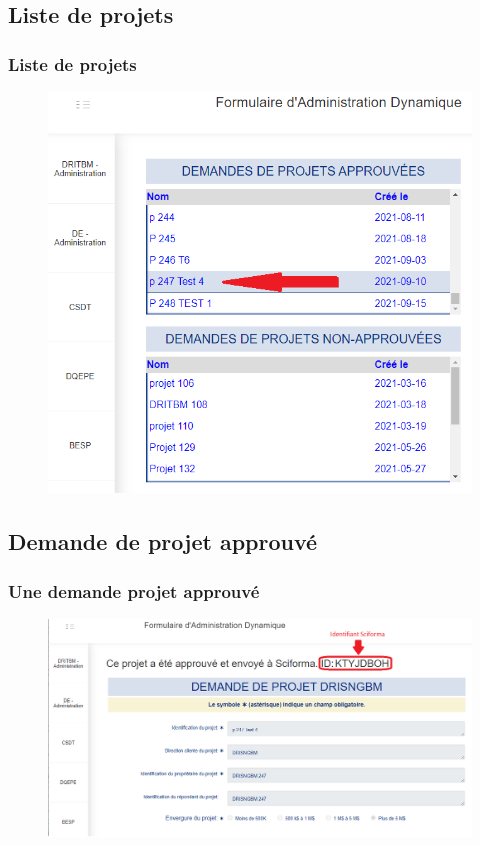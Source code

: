 \documentclass[aspectratio=169]{beamer}%
\begin{document}
\subsection{Liste de projets}
\begin{frame}
\transwipe 
\label{pictures}
\frametitle{Liste de projets}

\begin{figure}
\includegraphics[scale=0.33]{liste_de_demandes}
\end{figure}
\end{frame}

\subsection{Demande de projet approuvé}
\begin{frame}
\transwipe 
\label{pictures}
\frametitle{Une demande projet approuvé}

\begin{figure}
\includegraphics[scale=0.33]{demadeApprouve2}
\end{figure}
\end{frame}
\end{document}
